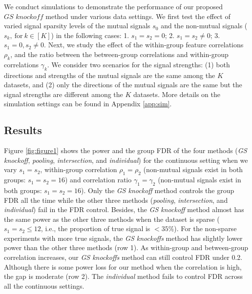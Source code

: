 \documentclass[11pt]{article}
\theoremstyle{plain}
\theoremstyle{definition}
\theoremstyle{remark}
\newcommand{\0}{\mathbf{0}}
\begin{document}
We conduct simulations to demonstrate the performance of our proposed $\textit{GS knockoff}$ method under various data settings. We first test the effect of varied signal sparsity levels of the mutual signals $s_0$ and the non-mutual signals ($s_k, ~\text{for}~ k \in [K]$) in the following cases: 1. $s_1=s_2=0$; 2. $s_1=s_2 \neq 0$; 3. $s_1=0, s_2 \neq 0$. Next, we study the effect of the within-group feature correlations $\rho_k$, and the ratio between the between-group correlations and within-group correlations $\gamma_k$. We consider two scenarios for the signal strengths: (1) both directions and strengths of the mutual signals are the same among the $K$ datasets, and (2) only the directions of the mutual signals are the same but the signal strengths are different among the $K$ datasets. More details on the simulation settings can be found in Appendix \ref{app:sim}.

\subsection{Results} %
Figure \ref{fig:figure1} shows the power and the group FDR of the four methods (\textit{GS knockoff}, \textit{pooling}, \textit{intersection}, and \textit{individual}) for the continuous setting when we vary $s_1=s_2$, within-group correlation $\rho_1=\rho_2$ (non-mutual signals exist in both groups: $s_1=s_2=16$) and correlation ratio $\gamma_1=\gamma_2$ (non-mutual signals exist in both groups: $s_1=s_2=16$). Only the \textit{GS knockoff} method controls the group FDR all the time while the other three methods (\textit{pooling}, \textit{intersection}, and \textit{individual}) fail in the FDR control. Besides, the \textit{GS knockoff} method almost has the same power as the other three methods when the dataset is sparse ($s_1=s_2\leq 12$, i.e., the proportion of true signal is $<35\%$). For the non-sparse experiments with more true signals, the \textit{GS knockoffs} method has slightly lower power than the other three methods (row 1). As within-group and between-group correlation increases, our \textit{GS knockoffs} method can still control FDR under 0.2. Although there is some power loss for our method when the correlation is high, the gap is moderate (row 2). The \textit{individual} method fails to control FDR across all the continuous settings.
\end{document}
